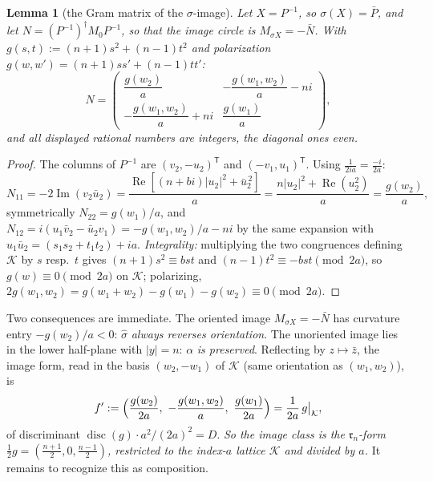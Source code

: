 \documentclass[11pt]{amsart}
\numberwithin{equation}{section}
\theoremstyle{plain}
\newtheorem{lemma}[theorem]{Lemma}
\theoremstyle{definition}
\theoremstyle{remark}
\newcommand{\im}{\operatorname{Im}}
\newcommand{\re}{\operatorname{Re}}
\newcommand{\disc}{\operatorname{disc}}
\newcommand{\idealr}{\mathfrak{r}}
\begin{document}
\begin{lemma}[the Gram matrix of the $\sigma$-image]\label{lem:lemmaB}
Let $X = P^{-1}$, so $\sigma(X) = \bar P$, and let
$N = (P^{-1})^{\dagger}M_0P^{-1}$, so that the image circle is
$M_{\sigma X} = -\bar N$.  With
$g(s, t) := (n+1)s^2 + (n-1)t^2$ and polarization
$g(w, w') = (n+1)ss' + (n-1)tt'$:
\[
  N = \begin{pmatrix}
  \dfrac{g(w_2)}{a} & -\dfrac{g(w_1, w_2)}{a} - ni \\[2mm]
  -\dfrac{g(w_1, w_2)}{a} + ni & \dfrac{g(w_1)}{a}
  \end{pmatrix},
\]
and all displayed rational numbers are integers, the diagonal ones
even.
\end{lemma}

\begin{proof}
The columns of $P^{-1}$ are $(v_2, -u_2)^{\mathsf T}$ and
$(-v_1, u_1)^{\mathsf T}$.  Using $\tfrac{1}{2ia} = \tfrac{-i}{2a}$:
\[
  N_{11} = -2\im(v_2\bar u_2)
  = \frac{\re[(n + bi)|u_2|^2 + \bar u_2^{\,2}]}{a}
  = \frac{n|u_2|^2 + \re(u_2^2)}{a} = \frac{g(w_2)}{a},
\]
symmetrically $N_{22} = g(w_1)/a$, and
$N_{12} = i(u_1\bar v_2 - \bar u_2 v_1) = -g(w_1, w_2)/a - ni$ by the
same expansion with $u_1\bar u_2 = (s_1s_2 + t_1t_2) + ia$.
\emph{Integrality:} multiplying the two congruences defining
$\mathcal{K}$ by $s$ resp.\ $t$ gives
$(n+1)s^2 \equiv bst$ and $(n-1)t^2 \equiv -bst \pmod{2a}$, so
$g(w) \equiv 0 \pmod{2a}$ on $\mathcal{K}$; polarizing,
$2g(w_1, w_2) = g(w_1 + w_2) - g(w_1) - g(w_2) \equiv 0 \pmod{2a}$.
\end{proof}

Two consequences are immediate.  The oriented image $M_{\sigma X} =
-\bar N$ has curvature entry $-g(w_2)/a < 0$: $\hat\sigma$
\emph{always reverses orientation}.  The unoriented image lies in the
lower half-plane with $|y| = n$: $\alpha$ \emph{is preserved}.
Reflecting by $z \mapsto \bar z$, the image form, read in the basis
$(w_2, -w_1)$ of $\mathcal{K}$ (same orientation as $(w_1, w_2)$), is
\begin{equation}\label{eq:fprime}
  f' := \Bigl(\frac{g(w_2)}{2a},\ -\frac{g(w_1, w_2)}{a},\
  \frac{g(w_1)}{2a}\Bigr) = \frac{1}{2a}\,g\big|_{\mathcal{K}},
\end{equation}
of discriminant $\disc(g)\cdot a^2/(2a)^2 = D$.  \emph{So the image
class is the $\idealr_n$-form $\tfrac12 g = (\tfrac{n+1}{2}, 0,
\tfrac{n-1}{2})$, restricted to the index-$a$ lattice $\mathcal{K}$ and
divided by $a$.}  It remains to recognize this as composition.
\end{document}
